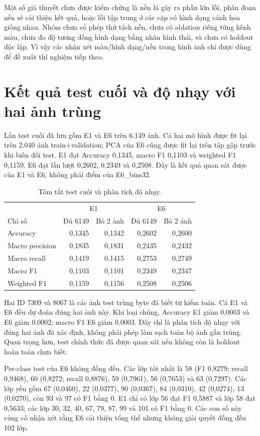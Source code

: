 Một số giả thuyết chưa được kiểm chứng là nền lá gây ra phần lớn lỗi, phân đoạn nền sẽ cải thiện kết quả, hoặc lỗi tập trung ở các cặp có hình dạng cánh hoa giống nhau. Nhóm chưa có phép thử tách nền, chưa có ablation riêng từng kênh màu, chưa đo độ tương đồng hình dạng bằng nhãn hình thái, và chưa có holdout độc lập. Vì vậy các nhận xét màu/hình dạng/nền trong hình ảnh chỉ được dùng để đề xuất thí nghiệm tiếp theo.

\section{Kết quả test cuối và độ nhạy với hai ảnh trùng}
Lần test cuối đã lưu gồm E1 và E6 trên 6.149 ảnh. Cả hai mô hình được fit lại trên 2.040 ảnh train+validation; PCA của E6 cũng được fit lại trên tập gộp trước khi biến đổi test. E1 đạt Accuracy 0,1345, macro F1 0,1103 và weighted F1 0,1159. E6 đạt lần lượt 0,2602, 0,2349 và 0,2508. Đây là kết quả quan sát được của E1 và E6, không phải điểm của E6\_bins32.

\begin{table}[H]\centering\small
\caption{Tóm tắt test cuối và phân tích độ nhạy.}\label{tab:finaltest}
\begin{tabular}{l|rr|rr}
\toprule
 & \multicolumn{2}{c|}{E1} & \multicolumn{2}{c}{E6}\\
Chỉ số & Đủ 6149 & Bỏ 2 ảnh & Đủ 6149 & Bỏ 2 ảnh\\
\midrule
Accuracy & 0,1345 & 0,1342 & 0,2602 & 0,2600\\
Macro precision & 0,1835 & 0,1831 & 0,2435 & 0,2432\\
Macro recall & 0,1419 & 0,1415 & 0,2753 & 0,2749\\
Macro F1 & 0,1103 & 0,1101 & 0,2349 & 0,2347\\
Weighted F1 & 0,1159 & 0,1156 & 0,2508 & 0,2506\\
\bottomrule
\end{tabular}
\end{table}

Hai ID 7309 và 8067 là các ảnh test trùng byte đã biết từ kiểm toán. Cả E1 và E6 đều dự đoán đúng hai ảnh này. Khi loại chúng, Accuracy E1 giảm 0,0003 và E6 giảm 0,0002; macro F1 E6 giảm 0,0003. Đây chỉ là phân tích độ nhạy với đúng hai ảnh đã xác định, không phải phép làm sạch toàn bộ ảnh gần trùng. Quan trọng hơn, test chính thức đã được quan sát nên không còn là holdout hoàn toàn chưa biết.

Per-class test của E6 không đồng đều. Các lớp tốt nhất là 58 (F1 0,8279; recall 0,9468), 60 (0,8272; recall 0,8876), 59 (0,7961), 56 (0,7653) và 63 (0,7297). Các lớp yếu gồm 67 (0,0460), 22 (0,0377), 90 (0,0367), 84 (0,0310), 42 (0,0274), 13 (0,0270), còn 93 và 97 có F1 bằng 0. E1 chỉ có lớp 56 đạt F1 0,5887 và lớp 58 đạt 0,5633; các lớp 30, 32, 40, 67, 79, 87, 99 và 101 có F1 bằng 0. Các con số này củng cố nhận xét rằng E6 cải thiện tổng thể nhưng không giải quyết đồng đều 102 lớp.

